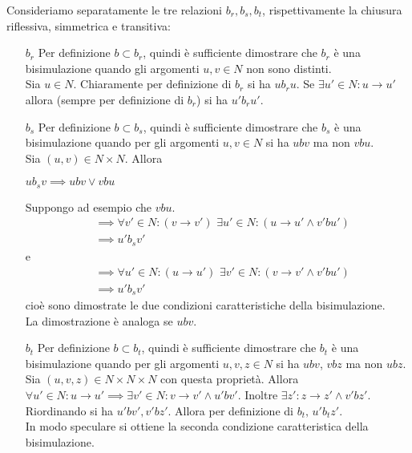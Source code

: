 \begin{proof2}
    Consideriamo separatamente le tre relazioni $b_r, b_s, b_t$, rispettivamente la chiusura riflessiva, simmetrica e transitiva:
    \begin{itemize}
        \item[$b_r$] Per definizione $b \subset b_r$, quindi è sufficiente dimostrare che $b_r$ è una bisimulazione quando gli argomenti $u,v \in N$ non sono distinti.\\
        Sia $u \in N$. Chiaramente per definizione di $b_r$ si ha $u b_r u$. Se $\exists u' \in N : u \to u'$ allora (sempre per definizione di $b_r$) si ha $u' b_r u'$.
        \item[$b_s$] Per definizione $b \subset b_s$, quindi è sufficiente dimostrare che $b_s$ è una bisimulazione quando per gli argomenti $u,v \in N$ si ha $u b v$ ma non $v b u$.\\
        Sia $(u,v) \in N \times N$. Allora
        \begin{center}
            $u b_s v \implies u b v \lor v b u$
        \end{center}
        Suppongo ad esempio che $v b u$.
        \begin{align*}
            &\implies \forall v' \in N : (v \to v') \,\,\exists u' \in N : (u \to u' \land v' bu')\\
            &\implies u' b_s v'
        \end{align*}
        e
        \begin{align*}
            &\implies \forall u' \in N : (u \to u') \,\,\exists v' \in N : (v \to v' \land v' bu')\\
            &\implies u' b_s v'
        \end{align*}
        cioè sono dimostrate le due condizioni caratteristiche della bisimulazione.\\
        La dimostrazione è analoga se $u b v$.
        \item[$b_t$] Per definizione $b \subset b_t$, quindi è sufficiente dimostrare che $b_t$ è una bisimulazione quando per gli argomenti $u,v,z \in N$ si ha $u b v$, $v b z$ ma non $u b z$.\\
        Sia $(u,v,z) \in N \times N \times N$ con questa proprietà. Allora $\forall u' \in N : u \to u' \implies \exists v' \in N : v \to v' \land u' b v'$. Inoltre $\exists z' : z \to z' \land v' b z'$.\\
        Riordinando si ha $u' b v', v' b z'$. Allora per definizione di $b_t, \, u' b_t z'$.\\
        In modo speculare si ottiene la seconda condizione caratteristica della bisimulazione.
    \end{itemize}
\end{proof2}
